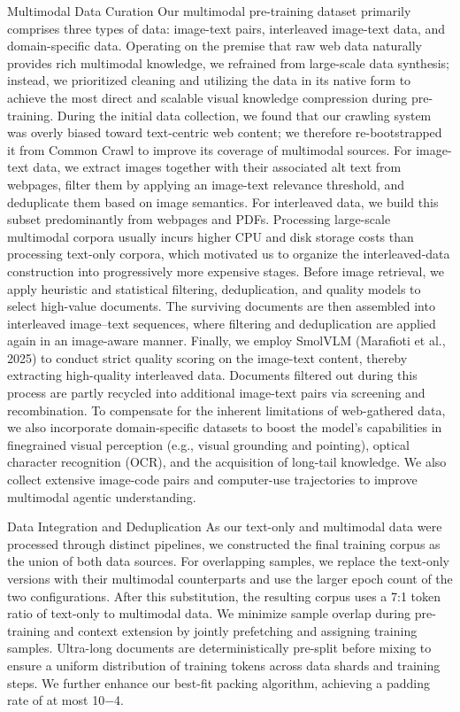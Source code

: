 \documentclass[
  10
]{article}
\begin{document}
Multimodal Data Curation Our multimodal pre-training dataset primarily
comprises three types of data: image-text pairs, interleaved image-text
data, and domain-specific data. Operating on the premise that raw web
data naturally provides rich multimodal knowledge, we refrained from
large-scale data synthesis; instead, we prioritized cleaning and
utilizing the data in its native form to achieve the most direct and
scalable visual knowledge compression during pre-training. During the
initial data collection, we found that our crawling system was overly
biased toward text-centric web content; we therefore re-bootstrapped it
from Common Crawl to improve its coverage of multimodal sources. For
image-text data, we extract images together with their associated alt
text from webpages, filter them by applying an image-text relevance
threshold, and deduplicate them based on image semantics. For
interleaved data, we build this subset predominantly from webpages and
PDFs. Processing large-scale multimodal corpora usually incurs higher
CPU and disk storage costs than processing text-only corpora, which
motivated us to organize the interleaved-data construction into
progressively more expensive stages. Before image retrieval, we apply
heuristic and statistical filtering, deduplication, and quality models
to select high-value documents. The surviving documents are then
assembled into interleaved image--text sequences, where filtering and
deduplication are applied again in an image-aware manner. Finally, we
employ SmolVLM (Marafioti et al., 2025) to conduct strict quality
scoring on the image-text content, thereby extracting high-quality
interleaved data. Documents filtered out during this process are partly
recycled into additional image-text pairs via screening and
recombination. To compensate for the inherent limitations of
web-gathered data, we also incorporate domain-specific datasets to boost
the model's capabilities in finegrained visual perception (e.g., visual
grounding and pointing), optical character recognition (OCR), and the
acquisition of long-tail knowledge. We also collect extensive image-code
pairs and computer-use trajectories to improve multimodal agentic
understanding.

Data Integration and Deduplication As our text-only and multimodal data
were processed through distinct pipelines, we constructed the final
training corpus as the union of both data sources. For overlapping
samples, we replace the text-only versions with their multimodal
counterparts and use the larger epoch count of the two configurations.
After this substitution, the resulting corpus uses a 7:1 token ratio of
text-only to multimodal data. We minimize sample overlap during
pre-training and context extension by jointly prefetching and assigning
training samples. Ultra-long documents are deterministically pre-split
before mixing to ensure a uniform distribution of training tokens across
data shards and training steps. We further enhance our best-fit packing
algorithm, achieving a padding rate of at most 10−4.
\end{document}
